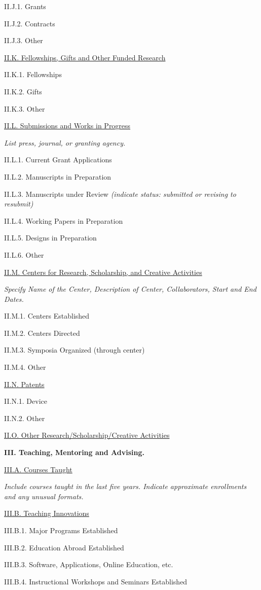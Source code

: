 \documentclass[11pt,letterpaper]{article}
\begin{document}
II.J.1. Grants

II.J.2. Contracts

II.J.3. Other


\underline{II.K. Fellowships, Gifts and Other Funded Research}

II.K.1. Fellowships

II.K.2. Gifts

II.K.3. Other


\underline{II.L. Submissions and Works in Progress}

\textit{List press, journal, or granting agency.}

II.L.1. Current Grant Applications

II.L.2. Manuscripts in Preparation

II.L.3. Manuscripts under Review \textit{(indicate status:  submitted or revising to resubmit)}

II.L.4. Working Papers in Preparation

II.L.5. Designs in Preparation

II.L.6. Other


\underline{II.M. Centers for Research, Scholarship, and Creative Activities}

\textit{Specify Name of the Center, Description of Center, Collaborators, Start and End Dates.}

II.M.1. Centers Established

II.M.2. Centers Directed

II.M.3. Symposia Organized (through center)

II.M.4. Other


\underline{II.N. Patents}

II.N.1. Device

II.N.2. Other


\underline{II.O. Other Research/Scholarship/Creative Activities}


\textbf{III. Teaching, Mentoring and Advising.}


\underline{III.A. Courses Taught}

\textit{Include courses taught in the last five years. Indicate approximate enrollments and any unusual formats.}

\underline{III.B. Teaching Innovations}

III.B.1. Major Programs Established

III.B.2. Education Abroad Established
 
III.B.3. Software, Applications, Online Education, etc.

III.B.4. Instructional Workshops and Seminars Established
\end{document}
